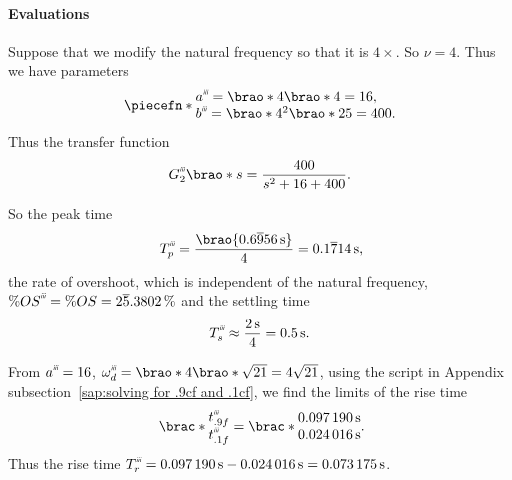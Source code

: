 \documentclass[12pt]{article}
\newcommand*\siexpr[2][]{\SI[parse-numbers=false,#1]{#2}}%
\DeclarePairedDelimiter\brao()%
\DeclarePairedDelimiter\brac[]%
\DeclarePairedDelimiter\piecefn\{.
\newcommand{\setprime}[2][1]{%
    {#2}^{%
        \raisebox{1pt}{%
            \scalebox{0.5}{%
                \itshape\sffamily\uppercase%
                \expandafter{%
                    \romannumeral#1%
                }%
            }%
        }
    }%
}%
\begin{document}
\begin{enumerate}[(a)]
        \paragraph{Evaluations}
        Suppose that we modify the natural frequency so that it is $4\times$.
        So $\nu = 4$. Thus we have parameters
        \begin{equation}
            \piecefn*{
                \begin{array}{@{}l@{}}
                    \setprime[3]a = \brao*4\brao*4 = 16,
                \\*
                    \setprime[3]b = \brao*4^2 \brao*{25} = 400.
                \\*
                \end{array}
            }
        \end{equation}
        Thus the transfer function
        \begin{equation}
            \setprime[3]G_2\brao*s = \frac{400}{s^2 + 16 + 400}.
        \end{equation}

        So the peak time
        \begin{equation}
              \setprime[3]T_p
            = \frac{\brao{\siexpr{0.6\overline956}\second}}{4}
            = \siexpr{0.1\overline714}\second\rlap,
        \end{equation}
        the rate of overshoot, which is independent of the natural frequency,
        $\%\setprime[3]{OS} = \%OS = \siexpr{2\overline5.3802}\percent$
        and the settling time
        \begin{equation}
                    \setprime[3]T_s
            \approx \frac{\SI2\second}4
                  = \SI{0.5}\second.
        \end{equation}

        From $\setprime[3]a = 16$, $\setprime[3]\omega_d = \brao*{4}\brao*{\sqrt{21}} = 4\sqrt{21}$,
        using the script in Appendix subsection~\ref{sap:solving for .9cf and .1cf},
        we find the limits of the rise time
        \begin{equation}
            \brac*{
                \begin{matrix}
                    \setprime[3]t_{.9f} \\*
                    \setprime[3]t_{.1f} \\*
                \end{matrix}
            }
            =
            \brac*{
                \begin{matrix}
                    \SI{0.097190}\second \\*
                    \SI{0.024016}\second \\*
                \end{matrix}
            }\rlap.
        \end{equation}
        Thus the rise time $\setprime[3]T_r = \SI{0.097190}\second - \SI{0.024016}\second = \SI{0.073175}\second$.


\end{enumerate}
\end{document}

